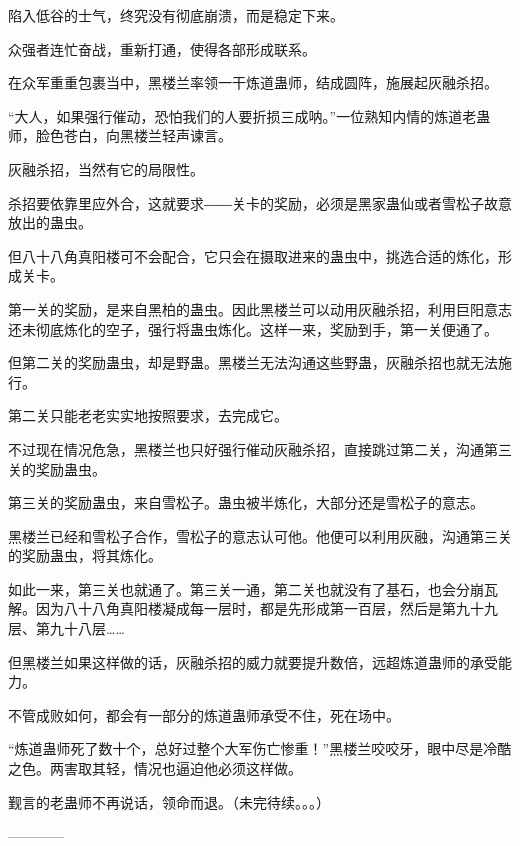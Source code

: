 \begin{this_body}
陷入低谷的士气，终究没有彻底崩溃，而是稳定下来。

众强者连忙奋战，重新打通，使得各部形成联系。

在众军重重包裹当中，黑楼兰率领一干炼道蛊师，结成圆阵，施展起灰融杀招。

“大人，如果强行催动，恐怕我们的人要折损三成呐。”一位熟知内情的炼道老蛊师，脸色苍白，向黑楼兰轻声谏言。

灰融杀招，当然有它的局限性。

杀招要依靠里应外合，这就要求――关卡的奖励，必须是黑家蛊仙或者雪松子故意放出的蛊虫。

但八十八角真阳楼可不会配合，它只会在摄取进来的蛊虫中，挑选合适的炼化，形成关卡。

第一关的奖励，是来自黑柏的蛊虫。因此黑楼兰可以动用灰融杀招，利用巨阳意志还未彻底炼化的空子，强行将蛊虫炼化。这样一来，奖励到手，第一关便通了。

但第二关的奖励蛊虫，却是野蛊。黑楼兰无法沟通这些野蛊，灰融杀招也就无法施行。

第二关只能老老实实地按照要求，去完成它。

不过现在情况危急，黑楼兰也只好强行催动灰融杀招，直接跳过第二关，沟通第三关的奖励蛊虫。

第三关的奖励蛊虫，来自雪松子。蛊虫被半炼化，大部分还是雪松子的意志。

黑楼兰已经和雪松子合作，雪松子的意志认可他。他便可以利用灰融，沟通第三关的奖励蛊虫，将其炼化。

如此一来，第三关也就通了。第三关一通，第二关也就没有了基石，也会分崩瓦解。因为八十八角真阳楼凝成每一层时，都是先形成第一百层，然后是第九十九层、第九十八层……

但黑楼兰如果这样做的话，灰融杀招的威力就要提升数倍，远超炼道蛊师的承受能力。

不管成败如何，都会有一部分的炼道蛊师承受不住，死在场中。

“炼道蛊师死了数十个，总好过整个大军伤亡惨重！”黑楼兰咬咬牙，眼中尽是冷酷之色。两害取其轻，情况也逼迫他必须这样做。

觐言的老蛊师不再说话，领命而退。（未完待续。。。）

------------

\end{this_body}

